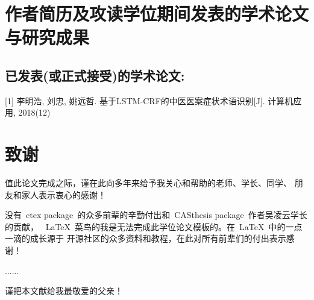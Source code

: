 \chapter{作者简历及攻读学位期间发表的学术论文与研究成果}

\section*{已发表(或正式接受)的学术论文:}

[1] 李明浩, 刘忠, 姚远哲. 基于LSTM-CRF的中医医案症状术语识别[J]. 计算机应用, 2018(12)

\chapter{致\quad 谢}


值此论文完成之际，谨在此向多年来给予我关心和帮助的老师、学长、同学、
朋友和家人表示衷心的感谢！

没有~ctex package~的众多前辈的辛勤付出和~CASthesis package~作者吴凌云学长的贡献，
~\LaTeX{}~菜鸟的我是无法完成此学位论文模板的。在~\LaTeX{}~中的一点一滴的成长源于
开源社区的众多资料和教程，在此对所有前辈们的付出表示感谢！

......

谨把本文献给我最敬爱的父亲！
